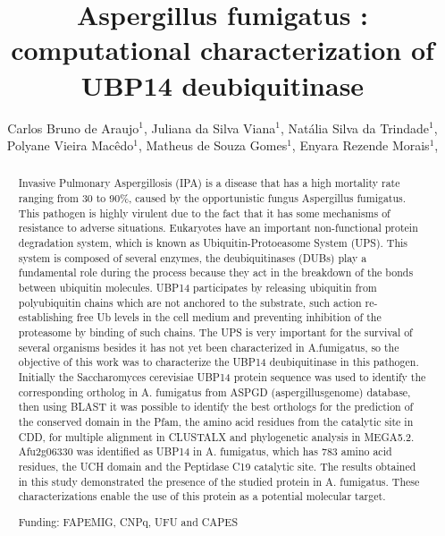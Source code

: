\documentclass[twoside]{article}
\title{\vspace{-15mm}\fontsize{24pt}{10pt}\selectfont\textbf{ Aspergillus fumigatus : computational characterization of  UBP14 deubiquitinase }} %
\author{ Carlos Bruno de Araujo$^{1}$, Juliana da Silva Viana$^{1}$, Natália Silva da Trindade$^{1}$, Polyane Vieira Macêdo$^{1}$, Matheus de Souza Gomes$^{1}$, Enyara Rezende Morais$^{1}$, }
\affil{ 1 UFU

 }
\date{}
\begin{document}
  
  
  \maketitle %
  
  
  \thispagestyle{fancy} %
  
  
  \begin{abstract}
  Invasive Pulmonary Aspergillosis (IPA) is a disease that has a high mortality rate ranging from 30 to 90\%, caused by the opportunistic fungus Aspergillus fumigatus. This pathogen is highly virulent due to the fact that it has some mechanisms of resistance to adverse situations. Eukaryotes have an important non-functional protein degradation system, which is known as Ubiquitin-Protoeasome System (UPS). This system is composed of several enzymes, the deubiquitinases (DUBs) play a fundamental role during the process because they act in the breakdown of the bonds between ubiquitin molecules. UBP14 participates by releasing ubiquitin from polyubiquitin chains which are not anchored to the substrate, such action re-establishing free Ub levels in the cell medium and preventing inhibition of the proteasome by binding of such chains. The UPS is very important for the survival of several organisms besides it has not yet been characterized in A.fumigatus, so the objective of this work was to characterize the UBP14 deubiquitinase in this pathogen. Initially the Saccharomyces cerevisiae UBP14 protein sequence was used to identify the corresponding ortholog in A. fumigatus from ASPGD (aspergillusgenome) database, then using BLAST it was possible to identify the best orthologs for the prediction of the conserved domain in the Pfam, the amino acid residues from the catalytic site in CDD, for multiple alignment in CLUSTALX and phylogenetic analysis in MEGA5.2. Afu2g06330 was identified as UBP14 in A. fumigatus, which has 783 amino acid residues, the UCH domain and the Peptidase C19 catalytic site. The results obtained in this study demonstrated the presence of the studied protein in A. fumigatus. These characterizations enable the use of this protein as a potential molecular target.
  
  Funding: FAPEMIG, CNPq, UFU and CAPES \\ 
  \end{abstract}
  
\end{document}
